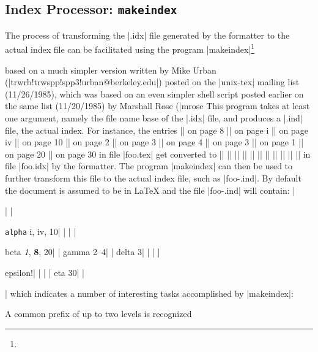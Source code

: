 {\begin{env}
\begin{minipage}
\subsection{Index Processor: {\tt makeindex}}
\noindent
The process of transforming the |.idx| file generated by the formatter to 
the actual index file can be facilitated using
the program |makeindex|\footnote{\dag}{based on a much simpler version
written by Mike Urban (|trwrb!trwspp!spp3!urban@berkeley.edu|) posted on the
|unix-tex| mailing list (11/26/1985), which was based on an even simpler shell
script posted earlier on the same list (11/20/1985) by Marshall Rose
(|mrose%
This program takes at least one argument, namely the file name base of
the |.idx| file, and produces a |.ind| file, the actual index.
For instance, the entries
\begindisplay
|| on page 8\cr
|| on page i\cr
|| on page iv\cr
|| on page 10\cr
|| on page 2\cr
|| on page 3\cr
|| on page 4\cr
|| on page 3\cr
|| on page 1\cr
|| on page 20\cr
|| on page 30\cr
\enddisplay
in file |foo.tex| get converted to
\begindisplay
||\cr
||\cr
||\cr
||\cr
||\cr
||\cr
||\cr
||\cr
||\cr
||\cr
||\cr
\enddisplay
in file |foo.idx| by the formatter.  The program |makeindex| can then be used
to further transform this file to the actual index file, such as |foo-.ind|.
By default the document is assumed to be in {\LaTeX} and the file |foo-.ind|
will contain:
\begindisplay
|\begin{theindex}\makeatletter|\cr
|  \item {\tt alpha}  i, iv, 10|\cr
|  \indexspace|\cr
|  \item beta  {\it 1\/}, {\bf 8}, 20|\cr
|    \subitem gamma  2--4|\cr
|      \subsubitem delta  3|\cr
|  \indexspace|\cr
|  \item epsilon!|\cr
|    |\cr
|      \subsubitem eta  30|\cr
|\end{theindex}|\cr
\enddisplay
which indicates a number of interesting tasks accomplished by |makeindex|:
\item{\bull}{A common prefix of up to two levels is recognized
}}
\end{minipage}
\end{env}}
